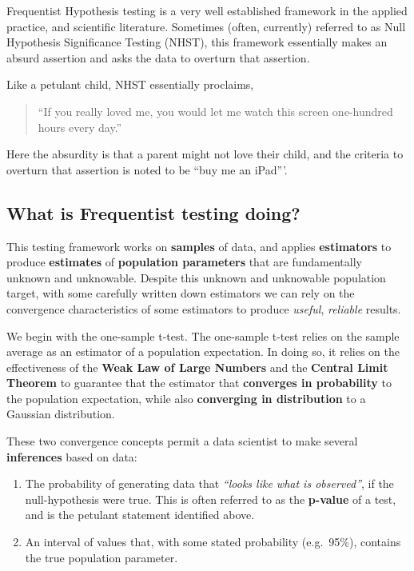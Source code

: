 \documentclass[
  letterpaper,
  DIV=11,
  numbers=noendperiod]{scrreprt}
\providecommand{\tightlist}{%
  \setlength{\itemsep}{0pt}\setlength{\parskip}{0pt}}\usepackage{longtable,booktabs,array}
\begin{document}
Frequentist Hypothesis testing is a very well established framework in
the applied practice, and scientific literature. Sometimes (often,
currently) referred to as Null Hypothesis Significance Testing (NHST),
this framework essentially makes an absurd assertion and asks the data
to overturn that assertion.

Like a petulant child, NHST essentially proclaims,

\begin{quote}
``If you really loved me, you would let me watch this screen one-hundred
hours every day.''
\end{quote}

Here the absurdity is that a parent might not love their child, and the
criteria to overturn that assertion is noted to be ``buy me an iPad'''.

\subsection*{What is Frequentist testing
doing?}\label{what-is-frequentist-testing-doing}

This testing framework works on \textbf{samples} of data, and applies
\textbf{estimators} to produce \textbf{estimates} of \textbf{population
parameters} that are fundamentally unknown and unknowable. Despite this
unknown and unknowable population target, with some carefully written
down estimators we can rely on the convergence characteristics of some
estimators to produce \emph{useful}, \emph{reliable} results.

We begin with the one-sample t-test. The one-sample t-test relies on the
sample average as an estimator of a population expectation. In doing so,
it relies on the effectiveness of the \textbf{Weak Law of Large Numbers}
and the \textbf{Central Limit Theorem} to guarantee that the estimator
that \textbf{converges in probability} to the population expectation,
while also \textbf{converging in distribution} to a Gaussian
distribution.

These two convergence concepts permit a data scientist to make several
\textbf{inferences} based on data:

\begin{enumerate}
\def\labelenumi{\arabic{enumi}.}
\tightlist
\item
  The probability of generating data that \emph{``looks like what is
  observed''}, if the null-hypothesis were true. This is often referred
  to as the \textbf{p-value} of a test, and is the petulant statement
  identified above.
\item
  An interval of values that, with some stated probability (e.g.~95\%),
  contains the true population parameter.
\end{enumerate}
\end{document}
